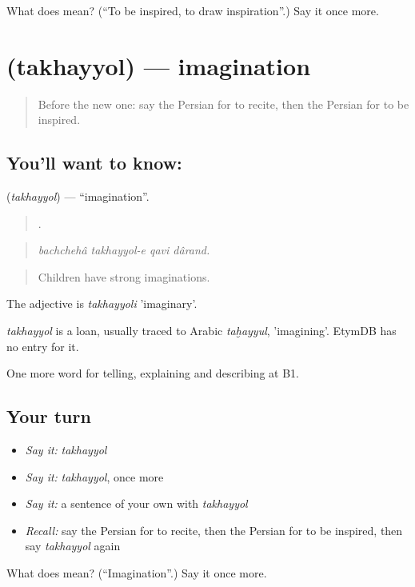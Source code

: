 \begin{tcolorbox}[breakable,colback=teal!4,colframe=teal!35!black,title={Before you move on}]
What does   mean? (\textquotedblleft{}To be inspired, to draw inspiration\textquotedblright{}.) Say it once more.
\end{tcolorbox}
\section[\texorpdfstring{\fa{تخیل} (takhayyol)}{تخیل (takhayyol)}]{ (takhayyol) — imagination}

\label{lesson:FA-C522-takhayyol}



\begin{quote}
Before the new one: say the Persian for to recite, then the Persian for to be inspired.
\end{quote}

\subsection*{You'll want to know: }
\textbf{} (\emph{takhayyol}) — \textquotedblleft{}imagination\textquotedblright{}.

\begin{quote}
    .
\end{quote}

\begin{quote}
\emph{bachchehâ takhayyol-e qavi dârand.}
\end{quote}

\begin{quote}
Children have strong imaginations.
\end{quote}

The adjective is \emph{takhayyoli} 'imaginary'.

\begin{cousinweb}
\emph{takhayyol} is a loan, usually traced to Arabic \emph{taḫayyul}, 'imagining'. EtymDB has no entry for it.
\end{cousinweb}

\begin{grammarlens}[title={What you've built}]
One more word for telling, explaining and describing at B1.
\end{grammarlens}

\subsection*{Your turn}
\begin{itemize}
\raggedright
  \item \emph{Say it:} \emph{takhayyol}
  \item \emph{Say it:} \emph{takhayyol}, once more
  \item \emph{Say it:} a sentence of your own with \emph{takhayyol}
  \item \emph{Recall:} say the Persian for to recite, then the Persian for to be inspired, then say \emph{takhayyol} again
\end{itemize}

\begin{tcolorbox}[breakable,colback=teal!4,colframe=teal!35!black,title={Before you move on}]
What does  mean? (\textquotedblleft{}Imagination\textquotedblright{}.) Say it once more.
\end{tcolorbox}
